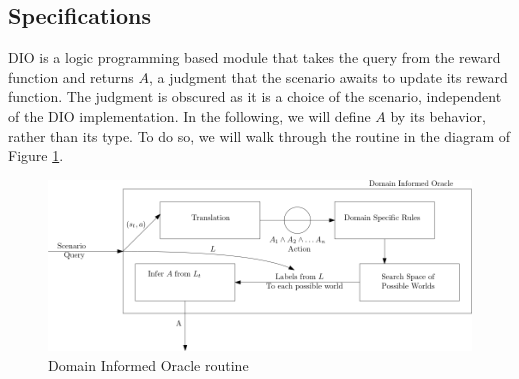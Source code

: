 \documentclass[a4paper,11pt]{article}
\theoremstyle{definition}
\begin{document}
\subsection{Specifications} \label{scspecs}
DIO is a logic programming based module that takes the query from the reward function and returns $A$, a judgment that the scenario awaits to update its reward function. The judgment is obscured as it is a choice of the scenario, 
independent of the DIO implementation. In the following, we will define $A$ by its behavior, rather than its type. To do so, we will walk through the routine in the diagram of Figure \ref{fig:diospecs}.


\begin{figure}[H]
  \centering
  \includegraphics[scale=0.46]{diospecs.png}
  \caption{Domain Informed Oracle routine}
  \label{fig:diospecs}
\end{figure}
\end{document}
